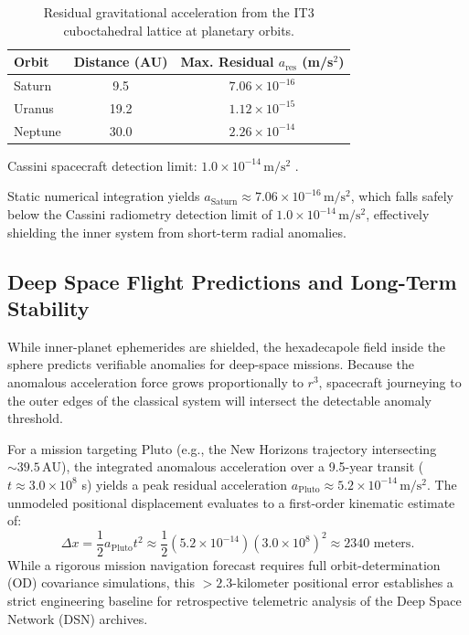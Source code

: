 \documentclass[11pt,a4paper]{article}
\theoremstyle{remark}
\newcommand{\AU}{\,\mathrm{AU}}
\begin{document}
\begin{table}[htbp]
    \centering
    \caption{Residual gravitational acceleration from the IT3 cuboctahedral lattice at planetary orbits.}
    \label{tab:acceleration}
    \begin{threeparttable}
    \begin{tabular}{lcc}
        \toprule
        \textbf{Orbit} & \textbf{Distance (AU)} & \textbf{Max. Residual $a_{\text{res}}$ (m/s$^2$)} \\
        \midrule
        Saturn  & 9.5  & $7.06 \times 10^{-16}$ \\
        Uranus  & 19.2 & $1.12 \times 10^{-15}$ \\
        Neptune & 30.0 & $2.26 \times 10^{-14}$ \\
        \bottomrule
    \end{tabular}
    \begin{tablenotes}
        \small
        \item Cassini spacecraft detection limit: $1.0 \times 10^{-14}\,\mathrm{m/s^2}$ \cite{fienga2016}.
    \end{tablenotes}
    \end{threeparttable}
\end{table}

Static numerical integration yields $a_{\text{Saturn}} \approx 7.06 \times 10^{-16}\,\mathrm{m/s^2}$, which falls safely below the Cassini radiometry detection limit of $1.0 \times 10^{-14}\,\mathrm{m/s^2}$, effectively shielding the inner system from short-term radial anomalies. 

\subsection{Deep Space Flight Predictions and Long-Term Stability}

While inner-planet ephemerides are shielded, the hexadecapole field inside the sphere predicts verifiable anomalies for deep-space missions. Because the anomalous acceleration force grows proportionally to $r^3$, spacecraft journeying to the outer edges of the classical system will intersect the detectable anomaly threshold. 

For a mission targeting Pluto (e.g., the New Horizons trajectory intersecting $\sim 39.5\AU$), the integrated anomalous acceleration over a 9.5-year transit ($t \approx 3.0 \times 10^8$ s) yields a peak residual acceleration $a_{\text{Pluto}} \approx 5.2 \times 10^{-14}\,\mathrm{m/s^2}$. The unmodeled positional displacement evaluates to a first-order kinematic estimate of:
\begin{equation}
    \Delta x = \frac{1}{2} a_{\text{Pluto}} t^2 \approx \frac{1}{2} (5.2 \times 10^{-14}) (3.0 \times 10^8)^2 \approx 2340 \text{ meters}.
\end{equation}
While a rigorous mission navigation forecast requires full orbit-determination (OD) covariance simulations, this $>2.3$-kilometer positional error establishes a strict engineering baseline for retrospective telemetric analysis of the Deep Space Network (DSN) archives.
\end{document}
